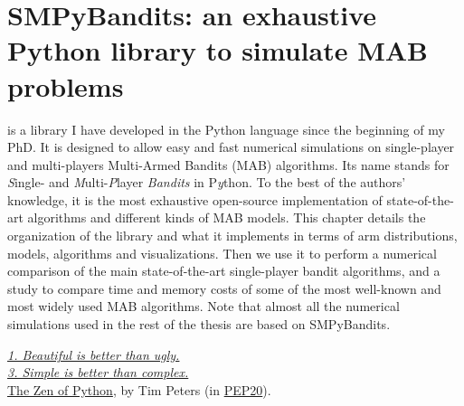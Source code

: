 
\chapter{SMPyBandits: an exhaustive Python library to simulate MAB problems}
\label{chapter:3}

\graphicspath{{2-Chapters/3-Chapter/Images/}{2-Chapters/3-Chapter/logs/}{2-Chapters/3-Chapter/SMPyBandits_paper.git/plots/}}


\abstractStartChapter{}%
%
\SMPyBandits{} is a library I have developed in the Python language since the beginning of my PhD.
It is designed to allow easy and fast numerical simulations on single-player and multi-players Multi-Armed Bandits (MAB) algorithms.
Its name stands for \emph{S}ingle- and \emph{M}ulti-\emph{P}layer \emph{Bandits} in P\emph{y}thon.
To the best of the authors' knowledge, it is the most exhaustive open-source implementation of state-of-the-art algorithms and different kinds of MAB models.
%
This chapter details the organization of the library and what it implements in terms of arm distributions, models, algorithms and visualizations.
Then we use it to perform a numerical comparison of the main state-of-the-art single-player bandit algorithms, and a study to compare time and memory costs of some of the most well-known and most widely used MAB algorithms.
%
Note that almost all the numerical simulations used in the rest of the thesis are based on SMPyBandits.


\begin{small}
    \begin{flushright}
        \emph{\href{https://zen-of-python.info/beautiful-is-better-than-ugly.html\#1}{1. Beautiful is better than ugly.}}\\
        \emph{\href{https://zen-of-python.info/simple-is-better-than-complex.html\#3}{3. Simple is better than complex.}}\\
        \href{https://zen-of-python.info/}{The Zen of Python},
        by Tim Peters (in \href{http://legacy.python.org/dev/peps/pep-0020/}{PEP20}).
    \end{flushright}
\end{small}


